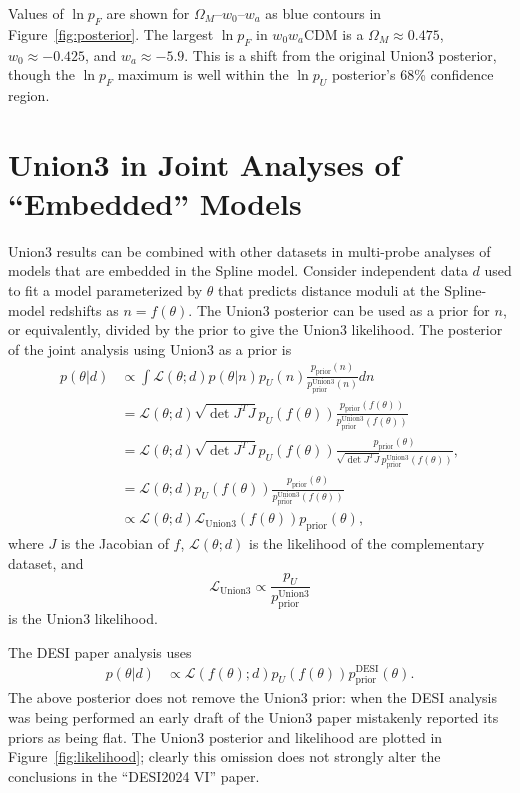 \documentclass{aastex631}
\begin{document}
Values of $\ln{p}_F$ are shown for  $\Omega_M$--$w_0$--$w_a$ as blue contours in Figure~\ref{fig:posterior}.
The largest $\ln{p_F}$ in $w_0w_a$CDM is a $\Omega_M\approx 0.475$, $w_0 \approx -0.425$, and $w_a \approx -5.9$.  This is a shift from the original Union3 posterior, though  the $\ln{p_F}$ maximum is well within
the $\ln{p_U}$ posterior's 68\% confidence region.

\section{Union3 in Joint Analyses of ``Embedded'' Models}
\label{sec:joint}
Union3 results can be combined with other datasets in multi-probe analyses of models that are embedded in the Spline model.
Consider independent data $d$ used to fit a model parameterized by $\theta$
that predicts distance moduli at the Spline-model redshifts as $n=f(\theta)$.
The Union3 posterior can be used as a prior for $n$, or equivalently, divided by the prior to
give the Union3 likelihood.  The posterior of the joint analysis using Union3 as a prior is
\begin{align}
p(\theta|d) &\propto \int  \mathcal{L}(\theta; d)p(\theta|n)p_U(n) \frac{p_\text{prior}(n)}{p^\text{Union3}_\text{prior}(n)}dn\\
&=  \mathcal{L}(\theta; d)    {\sqrt{\det{J^TJ}}}   {p_U(f(\theta))}  \frac{p_\text{prior}(f(\theta))}{p^\text{Union3}_\text{prior}(f(\theta))}\\
&=  \mathcal{L}(\theta; d)  {\sqrt{\det{J^TJ}}}  {p_U(f(\theta))}  \frac{p_\text{prior}(\theta)}{  {\sqrt{\det{J^TJ}}}  p^\text{Union3}_\text{prior}(f(\theta))}, \label{eq:correct} \\
&=  \mathcal{L}(\theta; d) {p_U(f(\theta))}  \frac{p_\text{prior}(\theta)}{ p^\text{Union3}_\text{prior}(f(\theta))} \\
&\propto  \mathcal{L}(\theta; d) \mathcal{L}_\text{Union3}(f(\theta)) {p_\text{prior}(\theta)}, \label{eq:correct}
\end{align}
 where  $J$ is the Jacobian of $f$,
$\mathcal{L}(\theta; d)$ is the likelihood of the complementary dataset, and
\begin{equation}
\mathcal{L}_\text{Union3} \propto \frac{p_U}{ p^\text{Union3}_\text{prior}}
 \end{equation}
is the Union3 likelihood.

The DESI paper analysis uses
\begin{align}
p(\theta | d) & \propto  \mathcal{L}(f(\theta);d) {p_U(f(\theta))}  p^\text{DESI}_\text{prior}(\theta) \label{eq:DESI}.
\end{align}
The above posterior does not remove the Union3 prior: when the DESI analysis
was being performed an early draft of the Union3 paper mistakenly reported its priors as being flat.    The Union3 posterior and likelihood are plotted
in Figure~\ref{fig:likelihood}; clearly this omission does not strongly alter the conclusions in the ``DESI2024 VI''
paper. 
\end{document}
